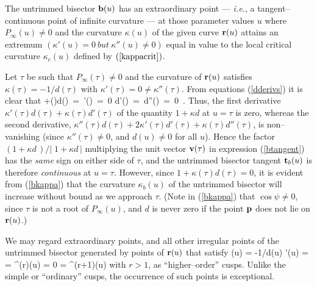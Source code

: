 \begin{lma}
The untrimmed bisector ${\bf b}(u)$ has an {\rm extraordinary point}
--- {\it i.e.}, a tangent--continuous point of infinite curvature
--- at those parameter values $u$ where $P_\infty(u)\not=0$ and the
curvature $\kappa(u)$ of the given curve ${\bf r}(u)$ attains an
extremum $(\kappa'(u)=0\ but\ \kappa''(u)\not=0)$ equal in value
to the local critical curvature $\kappa_c(u)$ defined by $(\ref
{kappacrit})$.
\end{lma}

\prf Let $\tau$ be such that $P_\infty(\tau)\not=0$ and the curvature
of ${\bf r}(u)$ satisfies $\kappa(\tau)=-1/d(\tau)$ with $\kappa'(\tau)
=0\not=\kappa''(\tau)$. From equations (\ref{dderivs}) it is clear that
+\kappa(\tau)d(\tau) \,=\, \kappa'(\tau) \,=\, 0
\;\;\Rightarrow\;\; d'(\tau) \,=\, d''(\tau) \,=\, 0 \,.
\ee
Thus, the first derivative $\kappa'(\tau)d(\tau)+\kappa(\tau)
d'(\tau)$ of the quantity $1+\kappa d$ at $u=\tau$ is zero, whereas
the second derivative, $\kappa''(\tau)d(\tau)+2\kappa'(\tau)d'(\tau)+
\kappa(\tau)d''(\tau)$, is non--vanishing (since $\kappa''(\tau)\not=
0$, and $d(u)\not=0$ for all $u$). Hence the factor $(1+\kappa d\,)
/ |\;\!1+\kappa d\,|$ multiplying the unit vector ${\bf v}(\tau)$
in expression (\ref{btangent}) has the {\it same\/} sign on either
side of $\tau$, and the untrimmed bisector tangent ${\bf t}_b(u)$ is
therefore {\it continuous\/} at $u=\tau$. However, since $1+\kappa
(\tau)d(\tau)=0$, it is evident from (\ref{bkappa}) that the curvature
$\kappa_b(u)$ of the untrimmed bisector will increase without bound as we
approach $\tau$. (Note in (\ref{bkappa}) that $\cos\psi\not=0$, since
$\tau$ is not a root of $P_\infty(u)$, and $d$ is never zero if the
point ${\bf p}$ does not lie on ${\bf r}(u)$.)
\QED

We may regard extraordinary points, and all other irregular points
of the untrimmed bisector generated by points of ${\bf r}(u)$ that
satisfy
\be
\kappa(u) = -1/d(u)  \quad \kappa'(u) =
\cdots = \kappa^{(r)}(u) = 0 \not= \kappa^{(r+1)}(u)
\ee
with $r > 1$, as ``higher--order'' cusps. Unlike the simple or
``ordinary'' cusps, the occurrence of such points is exceptional.

